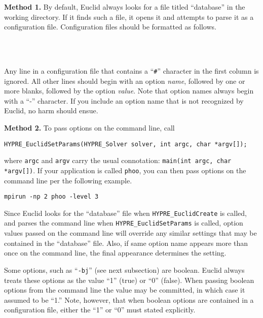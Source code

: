 {\bf Method 1.}
By default, Euclid always looks for a file titled
``database'' in the working directory. 
If it finds such a file, it opens it and attempts to parse it as
a configuration file.
Configuration files should be formatted as follows. 

\vspace{0.1in}
 \\
 \\
\vspace{0.1in}

Any line in a configuration file that contains a ``{\tt \#}''
character in the first column is ignored.
All other lines should begin with an option {\em name}, followed by
one or more blanks, followed by the option {\em value}.
Note that option names always begin with a ``-'' character.
If you include an option name that is not recognized by Euclid,
no harm should ensue.

{\bf Method 2.}
To pass options on the command line, call
\begin{display}
\begin{verbatim}
HYPRE_EuclidSetParams(HYPRE_Solver solver, int argc, char *argv[]);
\end{verbatim}
\end{display}
where {\tt argc} and {\tt argv} carry the usual connotation:
{\tt main(int argc, char *argv[])}.
If your \hypre{} application is called {\tt phoo}, you can
then pass options on the command line per the following example.

\begin{display}
\begin{verbatim}
mpirun -np 2 phoo -level 3
\end{verbatim}
\end{display}

Since Euclid looks for the ``database'' file when 
{\tt HYPRE\_EuclidCreate} is called, and parses the command line 
when {\tt HYPRE\_EuclidSetParams} is called,
option values passed on the command line will override 
any similar settings that may be contained in the ``database'' file.
Also, if same option name appears more than once on the command 
line, the final appearance determines the setting.

Some options, such as ``{\tt -bj}'' (see next subsection) are boolean.
Euclid always treats these options as the value ``1'' (true)
or ``0'' (false).  
When passing boolean options from the command line
the value may be committed, in which case it assumed to be ``1.''
Note, however, that when boolean options are contained in a
configuration file, either the ``1'' or ``0'' must
stated explicitly.

